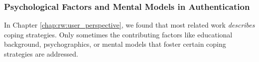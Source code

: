 \subsubsection{Psychological Factors and Mental Models in Authentication}
In Chapter \ref{chap:rw:user_perspective}, we found that most related work \textit{describes} coping strategies. Only sometimes the contributing factors like educational background, psychographics, or mental models that foster certain coping strategies are addressed. %

